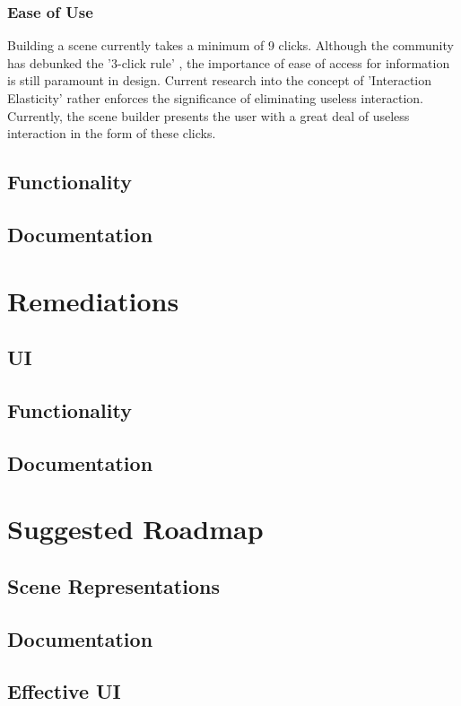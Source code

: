 \documentclass[sigconf]{acmart}
\begin{document}
\subsubsection{Ease of Use}
Building a scene currently takes a minimum of 9 clicks. Although the community has debunked the '3-click rule' \cite{WP-3CR}, the importance of ease of access for information is still paramount in design. Current research into the concept of 'Interaction Elasticity' \cite{IE-NG} rather enforces the significance of eliminating useless interaction. Currently, the scene builder presents the user with a great deal of useless interaction in the form of these clicks.

\subsection{Functionality}
\subsection{Documentation}

\section{Remediations}
	\lipsum[2-3]
\subsection{UI}
\subsection{Functionality}
\subsection{Documentation}

\section{Suggested Roadmap}
	\lipsum[2-3]
\subsection{Scene Representations}
\subsection{Documentation}
\subsection{Effective UI}
\end{document}

